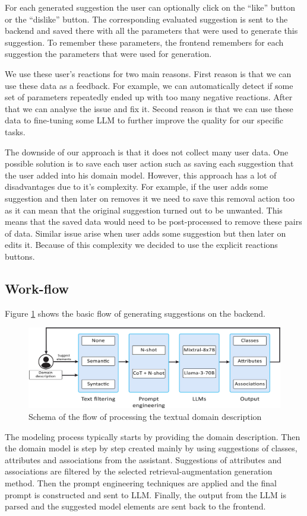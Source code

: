 For each generated suggestion the user can optionally click on the ``like'' button or the ``dislike'' button. The corresponding evaluated suggestion is sent to the backend and saved there with all the parameters that were used to generate this suggestion. To remember these parameters, the frontend remembers for each suggestion the parameters that were used for generation.

We use these user's reactions for two main reasons. First reason is that we can use these data as a feedback. For example, we can automatically detect if some set of parameters repeatedly ended up with too many negative reactions. After that we can analyse the issue and fix it. Second reason is that we can use these data to fine-tuning some LLM to further improve the quality for our specific tasks.

The downside of our approach is that it does not collect many user data. One possible solution is to save each user action such as saving each suggestion that the user added into his domain model. However, this approach has a lot of disadvantages due to it's complexity. For example, if the user adds some suggestion and then later on removes it we need to save this removal action too as it can mean that the original suggestion turned out to be unwanted. This means that the saved data would need to be post-processed to remove these pairs of data. Similar issue arise when user adds some suggestion but then later on edits it. Because of this complexity we decided to use the explicit reactions buttons.


\subsection{Work-flow}

Figure \ref{fig:work-flow} shows the basic flow of generating suggestions on the backend.

\begin{figure}[!h]
    \centering
    \includegraphics[scale=0.23]{img/work-flow.jpg}
    \caption{\centering Schema of the flow of processing the textual domain description}
    \label{fig:work-flow}
\end{figure}

The modeling process typically starts by providing the domain description. Then the domain model is step by step created mainly by using suggestions of classes, attributes and associations from the assistant. Suggestions of attributes and associations are filtered by the selected retrieval-augmentation generation method. Then the prompt engineering techniques are applied and the final prompt is constructed and sent to LLM. Finally, the output from the LLM is parsed and the suggested model elements are sent back to the frontend.
